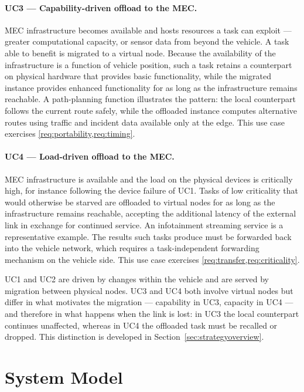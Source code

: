\paragraph{UC3 --- Capability-driven offload to the MEC.}
MEC infrastructure becomes available and hosts resources a task can exploit ---
greater computational capacity, or sensor data from beyond the vehicle. A task
able to benefit is migrated to a virtual node. Because the availability of the
infrastructure is a function of vehicle position, such a task retains a
counterpart on physical hardware that provides basic functionality, while the
migrated instance provides enhanced functionality for as long as the
infrastructure remains reachable. A path-planning function illustrates the
pattern: the local counterpart follows the current route safely, while the
offloaded instance computes alternative routes using traffic and incident data
available only at the edge. This use case exercises
\cref{req:portability,req:timing}.

\paragraph{UC4 --- Load-driven offload to the MEC.}
MEC infrastructure is available and the load on the physical devices is
critically high, for instance following the device failure of UC1. Tasks of low
criticality that would otherwise be starved are offloaded to virtual nodes for
as long as the infrastructure remains reachable, accepting the additional
latency of the external link in exchange for continued service. An infotainment
streaming service is a representative example. The results such tasks produce
must be forwarded back into the vehicle network, which requires a
task-independent forwarding mechanism on the vehicle side. This use case
exercises \cref{req:transfer,req:criticality}.

\bigskip
\noindent
UC1 and UC2 are driven by changes within the vehicle and are served by
migration between physical nodes. UC3 and UC4 both involve virtual nodes but
differ in what motivates the migration --- capability in UC3, capacity in UC4
--- and therefore in what happens when the link is lost: in UC3 the local
counterpart continues unaffected, whereas in UC4 the offloaded task must be
recalled or dropped. This distinction is developed in
Section~\ref{sec:strategyoverview}.


\section{System Model}\label{sec:systemmodel}


